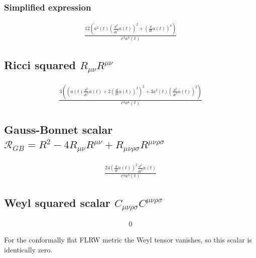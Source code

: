 \documentclass{article}
\begin{document}
\subsubsection*{Simplified expression}
\begin{align}
\frac{12 \left(a^{2}{\left(t \right)} \left(\frac{d^{2}}{d t^{2}} a{\left(t \right)}\right)^{2} + \left(\frac{d}{d t} a{\left(t \right)}\right)^{4}\right)}{c^{4} a^{4}{\left(t \right)}}
\end{align}

\subsection{Ricci squared $R_{\mu\nu}R^{\mu\nu}$}
\begin{align}
\frac{3 \left(\left(a{\left(t \right)} \frac{d^{2}}{d t^{2}} a{\left(t \right)} + 2 \left(\frac{d}{d t} a{\left(t \right)}\right)^{2}\right)^{2} + 3 a^{2}{\left(t \right)} \left(\frac{d^{2}}{d t^{2}} a{\left(t \right)}\right)^{2}\right)}{c^{4} a^{4}{\left(t \right)}}
\end{align}

\subsection{Gauss-Bonnet scalar $\mathcal{R}_{GB} = R^2 - 4R_{\mu\nu}R^{\mu\nu} + R_{\mu\nu\rho\sigma}R^{\mu\nu\rho\sigma}$}
\begin{align}
\frac{24 \left(\frac{d}{d t} a{\left(t \right)}\right)^{2} \frac{d^{2}}{d t^{2}} a{\left(t \right)}}{c^{4} a^{3}{\left(t \right)}}
\end{align}

\subsection{Weyl squared scalar $C_{\mu\nu\rho\sigma}C^{\mu\nu\rho\sigma}$}
\begin{align}
0
\end{align}

For the conformally flat FLRW metric the Weyl tensor vanishes, so this scalar is identically zero.
\end{document}
